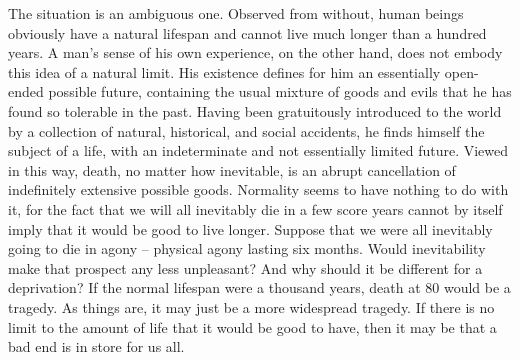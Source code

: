 The situation is an ambiguous one. Observed from without, human beings
obviously have a natural lifespan and cannot live much longer than a hundred
years. A man's sense of his own experience, on the other hand, does not
embody this idea of a natural limit. His existence defines for him an essentially
open-ended possible future, containing the usual mixture of goods and evils
that he has found so tolerable in the past. Having been gratuitously introduced
to the world by a collection of natural, historical, and social accidents, he finds
himself the subject of a life, with an indeterminate and not essentially limited
future. Viewed in this way, death, no matter how inevitable, is an abrupt
cancellation of indefinitely extensive possible goods. Normality seems to have
nothing to do with it, for the fact that we will all inevitably die in a few score
years cannot by itself imply that it would be good to live longer. Suppose that
we were all inevitably going to die in agony – physical agony lasting six months.
Would inevitability make that prospect any less unpleasant? And why should it
be different for a deprivation? If the normal lifespan were a thousand years,
death at 80 would be a tragedy. As things are, it may just be a more widespread
tragedy. If there is no limit to the amount of life that it would be good to have,
then it may be that a bad end is in store for us all.
\setcounter{footnote}{\thefa}